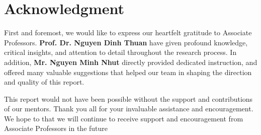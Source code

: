 \documentclass{ieeeojies}
\begin{document}
\section{Acknowledgment}
First and foremost, we would like to express our heartfelt gratitude to Associate Professors. \textbf{Prof. Dr. Nguyen Dinh Thuan} have given profound knowledge, critical insights, and attention to detail throughout the research
 process. In addition, \textbf{Mr. Nguyen Minh Nhut} directly provided dedicated instruction, and offered many valuable suggestions that helped our team in shaping the direction and quality of this report.

This report would not have been possible without the
 support and contributions of our mentors. Thank you all for your invaluable assistance and
 encouragement. We hope to that we will continue to receive support and encouragement from Associate Professors in the future
\end{document}
